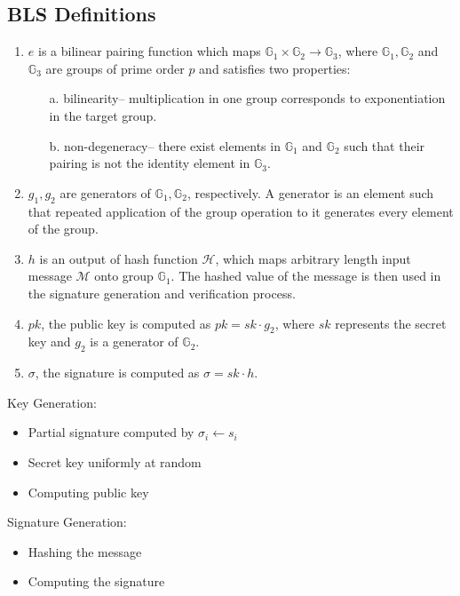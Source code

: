 \documentclass[12pt]{article}
\begin{document}
\subsection{BLS Definitions}\label{subsec:bls-definitions}

\begin{enumerate}
    \item \(e\) is a bilinear pairing function which maps \( \mathbb{G}_1 \times \mathbb{G}_2 \rightarrow \mathbb{G}_3 \), where \( \mathbb{G}_1, \mathbb{G}_2 \) and \(\mathbb{G}_3\) are groups of prime order \(p\) and satisfies two properties:
    \begin{enumerate}
        \item[a.] bilinearity-- multiplication in one group corresponds to exponentiation in the target group.
        \item[b.] non-degeneracy-- there exist elements in \( \mathbb{G}_1\) and \(\mathbb{G}_2\) such that their pairing is not the identity element in \(\mathbb{G}_3\).    
    \end{enumerate}    
    \item \(g_1, g_2\) are generators of \( \mathbb{G}_1, \mathbb{G}_2 \), respectively. A generator is an element such that repeated application of the group operation to it generates every element of the group.
    \item \(h\) is an output of hash function \(\mathcal{H}\), which maps arbitrary length input message \(\mathcal{M}\) onto group \(\mathbb{G}_1\). The hashed value of the message is then used in the signature generation and verification process.
    \item \(pk\), the public key is computed as \(pk = sk \cdot g_2\), where \(sk\) represents the secret key and \(g_2\) is a generator of \( \mathbb{G}_2\).
    \item \(\sigma\), the signature is computed as \( \sigma = sk \cdot h\).
\end{enumerate}

Key Generation: 
\begin{itemize}
    \item Partial signature computed by \( \sigma_i \leftarrow s_i \)
    \item Secret key uniformly at random
    \item Computing public key 
\end{itemize}

Signature Generation:
\begin{itemize}
    \item Hashing the message
    \item Computing the signature 
\end{itemize}
\end{document}
